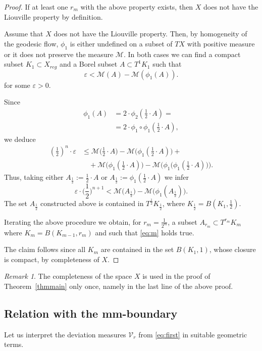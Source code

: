 \documentclass[12pt,leqno,intlimits]{amsart}
\numberwithin{equation}{section}
\theoremstyle{definition}
\theoremstyle{remark}
\newtheorem{rem}[thm]{Remark}
\newcommand{\tref}[1]{Theorem~\ref{#1}}
\begin{document}
\begin{proof}
If at least one $r_m$ with the above property exists, then $X$ does not have the Liouville property by definition.

{\color{red}

Assume that $X$ does not have the Liouville property.
Then, by homogeneity of the geodesic flow, $\phi _1$ is either undefined  on a subset of $TX$ with positive measure
or it does not preserve the measure $\mathcal M$.
In both cases we can find a compact subset $K_1\subset X_{reg}$ and a Borel subset $A\subset T^1 K_1$ such that
\[\varepsilon < \mathcal M (A) - \mathcal M(\phi_1 (A)).\]
for some $\varepsilon >0$.

}

Since
\begin{align*}
\phi_1 (A)&=2\cdot \phi _2 (\tfrac 1 2 \cdot A )=
\\
&=2\cdot \phi _1 \circ \phi_1 (\tfrac 1 2\cdot  A ) ,
\end{align*}
we deduce
\begin{align*}
(\tfrac 1 2)^n \cdot \varepsilon &\leq \mathcal M \big(\tfrac 1 2\cdot A \big) - \mathcal M \big( \phi_1 (\tfrac 1 2\cdot A ) \big) +
\\
&\quad+\mathcal M \big(\phi_1 (\tfrac 1 2\cdot A )\big)
- \mathcal M\big (\phi_1 \big (\phi _1 (\tfrac 1 2\cdot A )\big) \big).
\end{align*}
Thus, taking either $A_{\frac 1 2} := \frac 1 2 \cdot A$ or $A_{\frac 1 2} := \phi_1 (\frac 1 2 \cdot A)$ we infer
$$\varepsilon \cdot \Big(\frac 1 2 \Big )^{n+1} < \mathcal M \big(A _{\frac 1 2} \big) - \mathcal M \big( \phi_1 (A _{\frac 1 2}) \big).$$
The set $A_{\frac 1 2}$ constructed above is contained in $T^{\frac 1 2} K_{\frac 1 2}$, where $K _{\frac 1 2} =B (K_1,{\frac 1 2})$.

Iterating the above procedure we obtain, for $r_m =\frac 1 {2^m}$, a subset $A_{r_m} \subset T^{r_m} K_m$ where $K_m =B (K_{m-1},{r_m})$ and such that \eqref{eq:m} holds true.

The claim follows since all $K_m$ are contained in the set $B (K_1,1)$, whose closure is compact, by completeness of $X$.
\end{proof}

\begin{rem}
The completeness of the space $X$ is used in the proof of \tref{thmmain} only once, namely in the last line of the above proof.
\end{rem}

\subsection{Relation with the mm-boundary} Let us interpret the deviation measures $\mathcal{V}_r$ from \eqref{eq:first} in suitable geometric terms.
\end{document}

